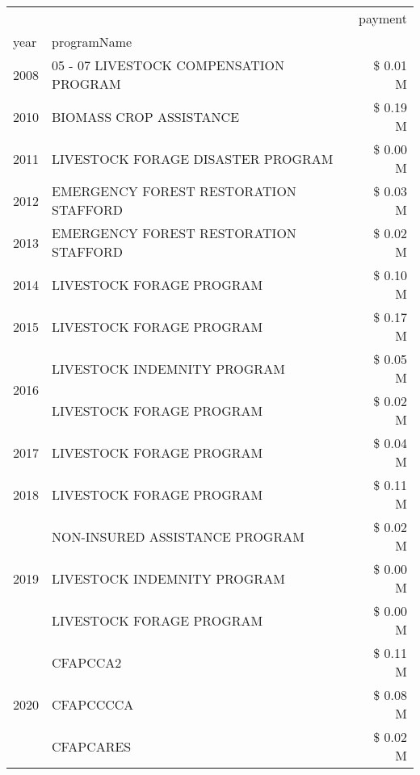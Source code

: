 \begin{tabular}{llr}
\toprule
 &  & payment \\
year & programName &  \\
\midrule
2008 & 05 - 07 LIVESTOCK COMPENSATION PROGRAM & \$ 0.01 M \\
\cline{1-3}
2010 & BIOMASS CROP ASSISTANCE & \$ 0.19 M \\
\cline{1-3}
2011 & LIVESTOCK FORAGE DISASTER PROGRAM & \$ 0.00 M \\
\cline{1-3}
2012 & EMERGENCY FOREST RESTORATION STAFFORD & \$ 0.03 M \\
\cline{1-3}
2013 & EMERGENCY FOREST RESTORATION STAFFORD & \$ 0.02 M \\
\cline{1-3}
2014 & LIVESTOCK FORAGE PROGRAM & \$ 0.10 M \\
\cline{1-3}
2015 & LIVESTOCK FORAGE PROGRAM & \$ 0.17 M \\
\cline{1-3}
\multirow[t]{2}{*}{2016} & LIVESTOCK INDEMNITY PROGRAM & \$ 0.05 M \\
 & LIVESTOCK FORAGE PROGRAM & \$ 0.02 M \\
\cline{1-3}
2017 & LIVESTOCK FORAGE PROGRAM & \$ 0.04 M \\
\cline{1-3}
2018 & LIVESTOCK FORAGE PROGRAM & \$ 0.11 M \\
\cline{1-3}
\multirow[t]{3}{*}{2019} & NON-INSURED ASSISTANCE PROGRAM & \$ 0.02 M \\
 & LIVESTOCK INDEMNITY PROGRAM & \$ 0.00 M \\
 & LIVESTOCK FORAGE PROGRAM & \$ 0.00 M \\
\cline{1-3}
\multirow[t]{3}{*}{2020} & CFAPCCA2 & \$ 0.11 M \\
 & CFAPCCCCA & \$ 0.08 M \\
 & CFAPCARES & \$ 0.02 M \\
\cline{1-3}
\bottomrule
\end{tabular}
